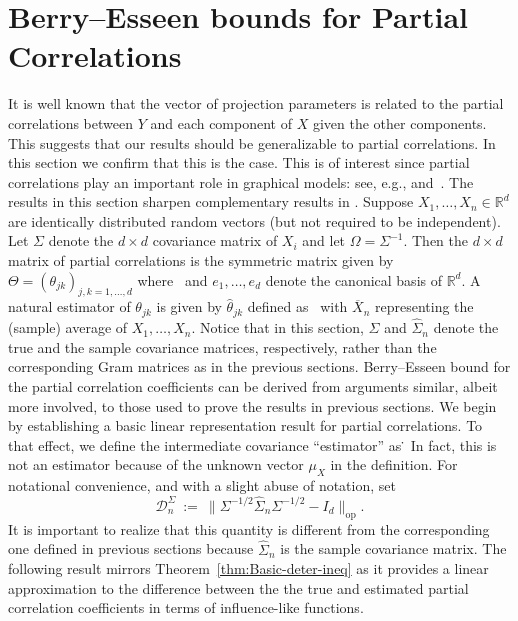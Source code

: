 \documentclass{article}
\begin{document}
\section{Berry--Esseen bounds for Partial Correlations}
\label{section::partial}
It is well known that the vector of projection parameters is related to the
partial correlations between $Y$ and each component of $X$ given
the other components.
This suggests that our results should be generalizable to
partial correlations.
In this section we confirm that this is the case.
This is of interest since partial correlations
play an important role in graphical models: see, e.g., \cite{Lau96} and~\cite{drton2004model}. The results in this section sharpen complementary results in \cite{wasserman2014berry}.
Suppose $X_1, \ldots, X_n\in\mathbb{R}^d$ are identically distributed random vectors (but not required to be independent). Let $\Sigma$ denote the $d\times d$ covariance matrix of $X_i$ and let $\Omega = \Sigma^{-1}.$ Then the $d \times d$ matrix of partial correlations is the symmetric matrix given by $\Theta = (\theta_{jk})_{j,k=1,\ldots,d}$ where
\ and $e_1, \ldots, e_d$ denote the canonical basis of $\mathbb{R}^d$. A natural estimator of $\theta_{jk}$ is given by $\widehat{\theta}_{jk}$ defined as
\ with $\overline{X}_n$ representing the (sample) average of $X_1, \ldots, X_n$. Notice that in this section, $\Sigma$ and $\widehat{\Sigma}_n$ denote the true and the sample covariance matrices, respectively,
rather than the corresponding Gram matrices as in the previous sections.
Berry--Esseen bound for the partial correlation coefficients can be derived from arguments similar, albeit more involved,
to those used to prove the results in previous sections. We begin by establishing a basic linear representation result for partial correlations. To that effect, we define the intermediate covariance ``estimator'' as
\.
\]
In fact, this is not an estimator because of the unknown vector $\mu_X$ in the definition. For notational convenience, and with a slight abuse of notation, set
\begin{equation}\label{eq:D-sigma-notation}
\mathcal{D}_n^{\Sigma} ~:=~ \|\Sigma^{-1/2}\widehat{\Sigma}_n\Sigma^{-1/2} - I_d\|_{\mathrm{op}}.
\end{equation}
It is important to realize that this quantity is different from the corresponding one defined in previous sections because $\widehat{\Sigma}_n$ is the sample covariance matrix.
The following result mirrors Theorem~\ref{thm:Basic-deter-ineq} as it provides a linear approximation to the difference between the the true and estimated partial correlation coefficients in terms of influence-like functions.
\end{document}
